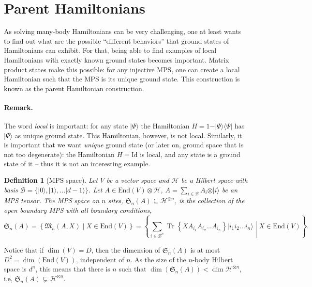 \documentclass{article}
\newtheorem{definition}{Definition}
\newcommand{\tr}{\operatorname{Tr}}
\newcommand{\id}{\mathrm{Id}}
\newcommand{\End}{\mathrm{End}}
\newcommand{\ket}[1]{\vert #1 \rangle}
\newcommand{\bra}[1]{\langle #1 \vert}
\begin{document}
\section{Parent Hamiltonians}

As solving many-body Hamiltonians can be very challenging, one at least wants to find out what are the possible ``different behaviors'' that ground states of Hamiltonians can exhibit. For that, being able to find examples of local Hamiltonians with exactly known ground states becomes important. Matrix product states make this possible: for any injective MPS, one can create a local Hamiltonian such that the MPS is its unique ground state. This construction is known as the parent Hamiltonian construction.

\paragraph{Remark.} The word \emph{local} is important: for any state $\ket{\Psi}$ the Hamiltonian $H = 1 - \ket{\Psi}\bra{\Psi}$ has $\ket{\Psi}$ as unique ground state. This Hamiltonian, however, is not local. Similarly, it is important that we want \emph{unique} ground state (or later on, ground space that is not too degenerate): the Hamiltonian $H=\id$ is local, and any state is a ground state of it -- thus it is not an interesting example.

\begin{definition}[MPS space]
  Let $V$ be a vector space and $\mathcal{H}$ be a Hilbert space with basis $\mathcal{B} = \{\ket{0},\ket{1},\dots \ket{d-1}\}$. Let $A\in \End(V)\otimes \mathcal{H}$, $A = \sum_{i\in \mathcal{B}} A_i \otimes \ket{i}$ be an MPS tensor. The MPS space on $n$ sites, $\mathfrak{S}_n(A)\subseteq \mathcal{H}^{\otimes n}$, is the collection of the open boundary MPS with all boundary conditions,
  \begin{equation*}
    \mathfrak{S}_n(A) = \left\{\mathfrak{M}_n(A,X) \middle| X\in \End(V) \right\} = \left\{\sum_{i\in \mathcal{B}^n} \tr\left\{XA_{i_1} A_{i_2} \dots A_{i_n}\right\} \ket{i_1 i_2 \dots i_n}\middle| X\in \End(V)\right\}.
  \end{equation*}
\end{definition}

Notice that if $\dim(V)=D$, then the dimension of $\mathfrak{S}_n(A)$ is at most $D^2 = \dim (\End(V))$, independent of $n$. As the size of the $n$-body Hilbert space is $d^n$, this means that there is $n$ such that $\dim(\mathfrak{S}_n(A))< \dim \mathcal{H}^{\otimes n}$, i.e,  $\mathfrak{S}_n(A)\subsetneq \mathcal{H}^{\otimes n}$.
\end{document}
